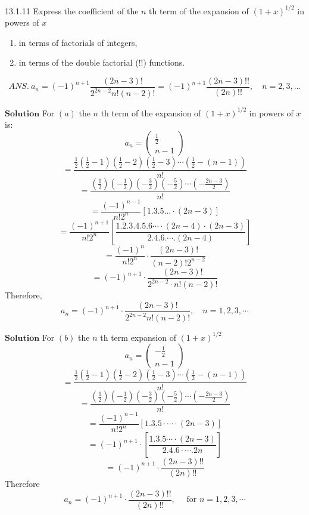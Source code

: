 \documentclass{styles/kaobook}
\begin{document}
\begin{greenbox}{13.1.11}
Express the coefficient of the $n$ th term of the expansion of $(1+x)^{1 / 2}$ in powers of $x$
\begin{enumerate}[$(a)$]
\item in terms of factorials of integers,
\item in terms of the double factorial (!!) functions.
\end{enumerate} 
$$
A N S . \ a_{n}=(-1)^{n+1} \frac{(2 n-3) !}{2^{2 n-2} n !(n-2) !}=(-1)^{n+1} \frac{(2 n-3) ! !}{(2 n) ! !},\quad n=2,3, \ldots
$$
\end{greenbox}

$\boxed{\textbf{Solution}}$ For $(a)$ the $n$ th term of the expansion of $(1+x)^{1 / 2}$ in powers of $x$ is:
$$a_{n}=\left(\begin{array}{c}\frac{1}{2} \\ n-1\end{array}\right)$$
$$=\frac{\frac{1}{2}\left(\frac{1}{2}-1\right)\left(\frac{1}{2}-2\right)\left(\frac{1}{2}-3\right) \cdots\left(\frac{1}{2}-(n-1)\right)}{n !}$$
$$=\frac{\left(\frac{1}{2}\right)\left(-\frac{1}{2}\right)\left(-\frac{3}{2}\right)\left(-\frac{5}{2}\right) \cdots\left(-\frac{2 n-3}{2}\right)}{n !}$$
$$=\frac{(-1)^{n-1}}{n ! 2^{n}}[1.3 .5 \ldots \cdot(2 n-3)]$$
$$=\frac{(-1)^{n+1}}{n ! 2^{n}}\left[\frac{1.2 .3 .4 .5 .6 \cdots \cdot(2 n-4) \cdot(2 n-3)}{2.4 .6 . \cdots .(2 n-4)}\right]$$
$$=\frac{(-1)^{n}}{n ! 2^{n}} \cdot \frac{(2 n-3) !}{(n-2) ! 2^{n-2}}$$
$$=(-1)^{n+1} \cdot \frac{(2 n-3) !}{2^{2 n-2} \cdot n !(n-2) !}$$
Therefore, 
$$
a_{n}=(-1)^{n+1} \cdot \frac{(2 n-3) !}{2^{2 n-2} n !(n-2) !}, \quad  n=1,2,3, \cdots
$$

$\boxed{\textbf{Solution}}$ For $(b)$ the $n$ th term expansion of $(1+x)^{1 / 2}$ 
$$a_{n}=\left(\begin{array}{c}-\frac{1}{2} \\ n-1\end{array}\right)$$
$$=\frac{\frac{1}{2}\left(\frac{1}{2}-1\right)\left(\frac{1}{2}-2\right)\left(\frac{1}{2}-3\right) \cdots\left(\frac{1}{2}-(n-1)\right)}{n !}$$
$$=\frac{\left(\frac{1}{2}\right)\left(-\frac{1}{2}\right)\left(-\frac{3}{2}\right)\left(-\frac{5}{2}\right) \cdots\left(-\frac{2 n-3}{2}\right)}{n !}$$
$$=\frac{(-1)^{n-1}}{n ! 2^{n}}[1.3 .5 \cdot \cdots \cdot(2 n-3)]$$
$$=(-1)^{n+1} \cdot\left[\frac{1.3 .5 \cdots \cdot(2 n-3)}{2.4 .6 \cdot \cdots .2 n}\right]$$
$$=(-1)^{n+1} \cdot \frac{(2 n-3) ! !}{(2 n) ! !}$$
Therefore
$$
a_{n}=(-1)^{n+1} \cdot \frac{(2 n-3) ! !}{(2 n) ! !}, \quad \text { for } n=1,2,3, \cdots
$$
\end{document}
